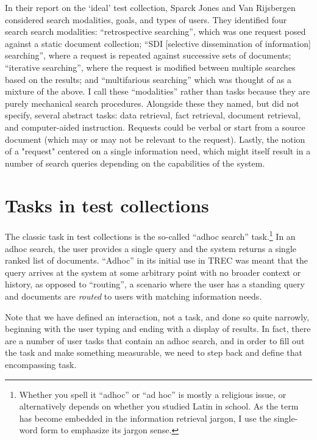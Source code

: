 \documentclass[nobib]{tufte-book}
\begin{document}
In their report on the `ideal' test collection, Sparck Jones and Van Rijsbergen considered search modalities, goals, and types of users.  They identified four search search modalities: ``retrospective searching'', which was one request posed against a static document collection; ``SDI [selective dissemination of information] searching'', where a request is repeated against successive sets of documents; ``iterative searching'', where the request is modified between multiple searches based on the results; and ``multifarious searching'' which was thought of as a mixture of the above.\autocite{sparck_jones_report_1975}  I call these ``modalities'' rather than tasks because they are purely mechanical search procedures.  Alongside these they named, but did not specify, several abstract tasks: data retrieval, fact retrieval, document retrieval, and computer-aided instruction.  Requests could be verbal or start from a source document (which may or may not be relevant to the request).  Lastly, the notion of a "request" centered on a single information need, which might itself result in a number of search queries depending on the capabilities of the system.

\section{Tasks in test collections}

The classic task in test collections is the so-called ``adhoc search'' task.\footnote{Whether you spell it ``adhoc'' or ``ad hoc'' is mostly a religious issue, or alternatively depends on whether you studied Latin in school.  As the term has become embedded in the information retrieval jargon, I use the single-word form to emphasize its jargon sense.}  In an adhoc search, the user provides a single query and the system returns a single ranked list of documents.  ``Adhoc'' in its initial use in TREC was meant that the query arrives at the system at some arbitrary point with no broader context or history, as opposed to ``routing'', a scenario where the user has a standing query and documents are {\em routed} to users with matching information needs.

Note that we have defined an interaction, not a task, and done so quite narrowly, beginning with the user typing and ending with a display of results.  In fact, there are a number of user tasks that contain an adhoc search, and in order to fill out the task and make something measurable, we need to step back and define that encompassing task.
\end{document}
